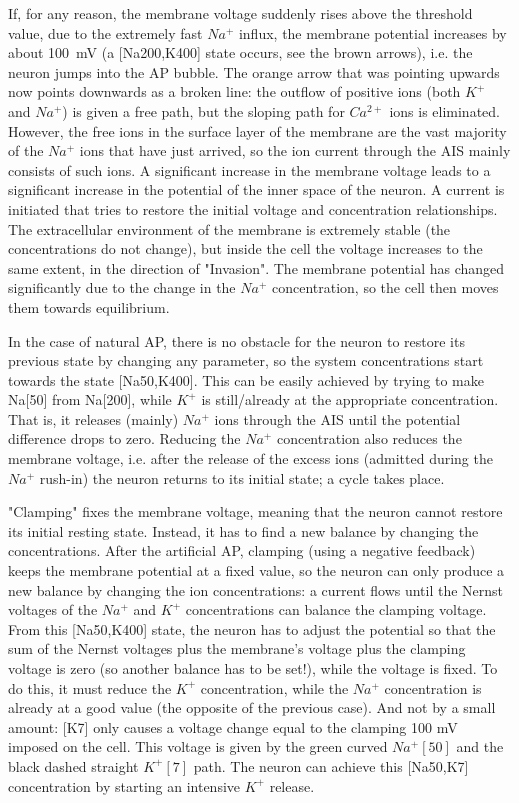 If, for any reason, the membrane voltage suddenly rises above the threshold value, due to the extremely fast $Na^+$ influx,
the membrane potential increases by about \SI{100}{\milli\volt} (a [Na200,K400] state occurs, see the brown arrows), i.e. the neuron jumps into the AP bubble.
The orange arrow that was pointing upwards now points downwards as a broken line: the outflow of positive ions (both $K^+$ and $Na^+$) is given a free path, but the sloping path for $Ca^{2+}$ ions is eliminated. However, the free ions in the surface layer of the membrane are the vast majority of the $Na^+$ ions that have just arrived, so the ion current through the \gls{AIS} mainly consists of such ions.
A significant increase in the membrane voltage leads to a significant increase in the potential of the
inner space of the neuron.
A current is initiated that tries to restore the initial voltage and concentration relationships.
The extracellular environment of the membrane is extremely stable (the concentrations do not change),
but inside the cell the voltage increases to the same extent, in the direction of "Invasion".
The membrane potential has changed significantly due to the change in the $Na^+$ concentration, so the cell then moves them towards equilibrium.


In the case of natural \gls{AP}, there is no obstacle for the neuron
to restore its previous state by changing any parameter, so the system concentrations
start towards the state [Na50,K400]. This can be
easily achieved by trying to make Na[50] from Na[200], while $K^+$ is still/already at the appropriate concentration.
That is, it releases (mainly) $Na^+$ ions through the \gls{AIS} until the potential difference drops to zero.
Reducing the $Na^+$ concentration also reduces the membrane
voltage, i.e. after the release of the excess ions (admitted during the $Na^+$ rush-in) the neuron returns to its initial state;
a cycle takes place.

"Clamping" fixes the membrane voltage, meaning that the neuron cannot restore its initial
resting state. Instead, it has to find a new balance by changing the concentrations.
After the artificial \gls{AP}, clamping (using a negative feedback) keeps the membrane potential at a fixed value, so the neuron can only produce a new balance by changing the ion concentrations: a current flows until the Nernst voltages of the $Na^+$ and $K^+$ concentrations can balance the clamping voltage.
From this [Na50,K400] state, the neuron has to adjust the potential so that the sum of the Nernst voltages plus the membrane's voltage plus the clamping voltage is zero (so another balance has to be set!), while the voltage is fixed.
To do this, it must reduce the $K^+$ concentration, while the $Na^+$ concentration is already at a good value (the opposite of the previous case). And not by a small amount: [K7] only causes a voltage change equal to the clamping 100 mV imposed on the cell.
This voltage is given by the green curved $Na^+[50]$ and the black dashed straight
$K^+[7]$ path. The neuron can achieve this [Na50,K7] concentration
by starting an intensive $K^+$ release.

